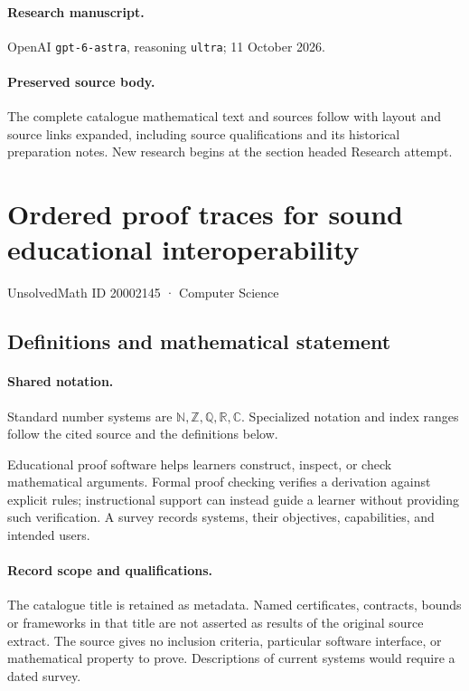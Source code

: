 \documentclass[11pt]{article}
\begin{document}
\paragraph{Research manuscript.} OpenAI \texttt{gpt-6-astra}, reasoning \texttt{ultra}; 11 October 2026.
\paragraph{Preserved source body.} The complete catalogue mathematical text and sources follow with layout and source links expanded, including source qualifications and its historical preparation notes. New research begins at the section headed Research attempt.

\section{Ordered proof traces for sound educational interoperability}\label{20002145}
{\small UnsolvedMath ID 20002145 · Computer Science}
\subsection{Definitions and mathematical statement}

\paragraph{Shared notation.}Standard number systems are $\mathbb N,\mathbb Z,\mathbb Q,\mathbb R,\mathbb C$. Specialized notation and index ranges follow the cited source and the definitions below.


Educational proof software helps learners construct, inspect, or check mathematical arguments. Formal proof checking verifies a derivation against explicit rules; instructional support can instead guide a learner without providing such verification. A survey records systems, their objectives, capabilities, and intended users.
\paragraph{Record scope and qualifications.}
The catalogue title is retained as metadata. Named certificates, contracts, bounds or frameworks in that title are not asserted as results of the original source extract.
The source gives no inclusion criteria, particular software interface, or mathematical property to prove. Descriptions of current systems would require a dated survey.
\end{document}
